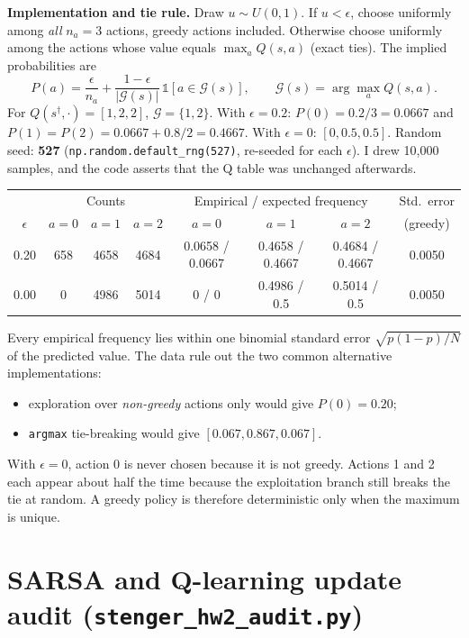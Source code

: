 \documentclass[11pt]{article}
\begin{document}
\textbf{Implementation and tie rule.} Draw $u\sim U(0,1)$. If $u<\epsilon$,
choose uniformly among \emph{all} $n_a=3$ actions, greedy actions included.
Otherwise choose uniformly among the actions whose value equals
$\max_a Q(s,a)$ (exact ties). The implied probabilities are
\[
P(a)=\frac{\epsilon}{n_a}+\frac{1-\epsilon}{|\mathcal G(s)|}\,\mathbb 1[a\in\mathcal G(s)],\qquad
\mathcal G(s)=\arg\max_a Q(s,a).
\]
For $Q(s^\dagger,\cdot)=[1,2,2]$, $\mathcal G=\{1,2\}$. With $\epsilon=0.2$:
$P(0)=0.2/3=0.0667$ and $P(1)=P(2)=0.0667+0.8/2=0.4667$. With $\epsilon=0$:
$[0,0.5,0.5]$. Random seed: \textbf{527} (\texttt{np.random.default\_rng(527)},
re-seeded for each $\epsilon$). I drew 10{,}000 samples, and the code asserts
that the Q table was unchanged afterwards.

\begin{table}[H]
\centering\small
\begin{tabular}{c ccc ccc c}\toprule
 & \multicolumn{3}{c}{Counts} & \multicolumn{3}{c}{Empirical / expected frequency} & Std.\ error\\
$\epsilon$ & $a{=}0$ & $a{=}1$ & $a{=}2$ & $a{=}0$ & $a{=}1$ & $a{=}2$ & (greedy)\\\midrule
0.20 & 658 & 4658 & 4684 & 0.0658 / 0.0667 & 0.4658 / 0.4667 & 0.4684 / 0.4667 & 0.0050\\
0.00 & 0 & 4986 & 5014 & 0 / 0 & 0.4986 / 0.5 & 0.5014 / 0.5 & 0.0050\\\bottomrule
\end{tabular}
\end{table}
Every empirical frequency lies within one binomial standard error
$\sqrt{p(1-p)/N}$ of the predicted value. The data rule out the two common
alternative implementations:
\begin{itemize}\itemsep0pt
\item exploration over \emph{non-greedy} actions only would give $P(0)=0.20$;
\item \texttt{argmax} tie-breaking would give $[0.067,0.867,0.067]$.
\end{itemize}
With $\epsilon=0$, action 0 is never chosen because it is not greedy. Actions 1 and
2 each appear about half the time because the exploitation branch still breaks the
tie at random. A greedy policy is therefore deterministic only when the maximum
is unique.

\section{SARSA and Q-learning update audit (\texttt{stenger\_hw2\_audit.py})}
\end{document}
